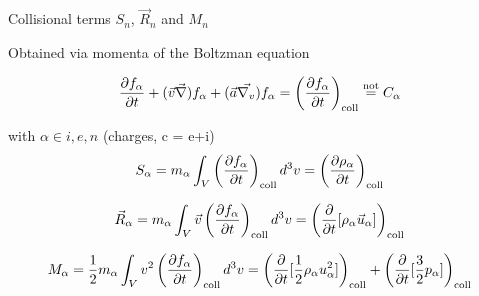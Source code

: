 \documentclass{beamer}
\begin{document}
\begin{frame}{Collisional terms $S_n$, $\vec{R}_n$ and $M_n$}

Obtained via momenta of the Boltzman equation

\begin{equation} \nonumber
\frac{\partial f_{\alpha} }{\partial t} + (\vec{v}\vec{\nabla})  f_{\alpha} + (\vec{a} \vec{\nabla_v} )f_{\alpha} = \left (\frac{\partial f_{\alpha}}{\partial t} \right )_{\rm coll} \stackrel{\text{not}}{=} C_\alpha 
\end{equation}

with $\alpha \in {i,e,n}$ (charges, c = e+i)
%
\begin{equation} \nonumber
S_{\alpha}=m_{\alpha}\int_{V}{\left(\frac{\partial f_{\alpha}}{\partial t}\right)_{\rm coll} d^3 v} = \left( \frac{\partial \rho_{\alpha}}{\partial t} \right)_{\rm coll} 
\end{equation}

\begin{equation} \nonumber
\vec{R}_{\alpha}=m_{\alpha}\int_V{\vec{v}\left(\frac{\partial f_{\alpha}}{\partial t}\right)_{\rm coll}d^3 v} = \left( \frac{\partial}{\partial t}
[\rho_{\alpha}\vec{u}_{\alpha}] \right)_{\rm coll}
\end{equation}


\begin{equation} \nonumber
M_{\alpha}=\frac{1}{2} m_{\alpha} \int_V{v^2\left(\frac{\partial f_{\alpha}}{\partial t}\right)_{\rm coll} d^3 v} = \left( \frac{\partial }{\partial t} [\frac{1}{2}\rho_{\alpha} u_{\alpha}^2] \right)_{\rm coll}  +
\left( \frac{\partial }{\partial t} [\frac{3}{2}p_{\alpha}] \right)_{\rm coll}
\end{equation}

\end{frame}
\end{document}
